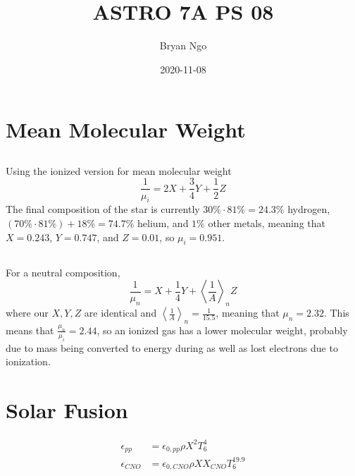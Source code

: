 \documentclass{article}
\title{ASTRO 7A PS 08}
\author{Bryan Ngo}
\date{2020-11-08}
\begin{document}
\maketitle

\section{Mean Molecular Weight}

\subsection{}

Using the ionized version for mean molecular weight
\begin{equation}
    \frac{1}{\mu_i} = 2X + \frac{3}{4}Y + \frac{1}{2}Z
\end{equation}
The final composition of the star is currently \(30\% \cdot 81\% = 24.3\%\) hydrogen, \((70\% \cdot 81\%) + 18\% = 74.7\%\) helium, and \(1\%\) other metals, meaning that \(X = 0.243\), \(Y = 0.747\), and \(Z = 0.01\), so \(\mu_i = \num{0.951}\).

\subsection{}

For a neutral composition,
\begin{equation}
    \frac{1}{\mu_n} = X + \frac{1}{4}Y + \left\langle\frac{1}{A}\right\rangle_n Z
\end{equation}
where our \(X, Y, Z\) are identical and \(\left\langle\frac{1}{A}\right\rangle_n = \frac{1}{15.5}\), meaning that \(\mu_n = \num{2.32}\).
This means that \(\frac{\mu_n}{\mu_i} = \num{2.44}\), so an ionized gas has a lower molecular weight, probably due to mass being converted to energy during as well as lost electrons due to ionization.

\section{Solar Fusion}

\begin{align}
    \epsilon_{pp} &= \epsilon_{0, pp} \rho X^2 T_6^4 \\
    \epsilon_{CNO} &= \epsilon_{0, CNO} \rho X X_{CNO} T_6^{19.9}
\end{align}

\subsection{}
\end{document}
